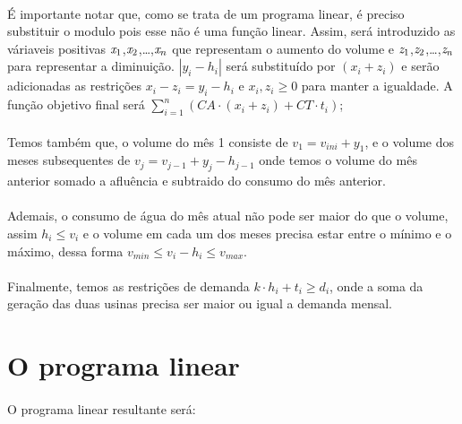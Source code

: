 \documentclass{article}
\begin{document}
\paragraph{} É importante notar que, como se trata de um programa linear, é preciso substituir o modulo pois esse não é uma função linear. Assim, será introduzido as váriaveis positivas $\emph{x}_1$,$\emph{x}_2$,\dots,$\emph{x}_n$ que representam o aumento do volume e $\emph{z}_1$,$\emph{z}_2$,\dots,$\emph{z}_n$ para representar a diminuição. \emph{$| y_{i} - h_{i} |$} será substituído por \emph{$(x_i + z_i)$} e serão adicionadas as restrições \emph{$x_i - z_i = y_i - h_i$} e \emph{$x_i,z_i \ge 0$} para manter a igualdade. A função objetivo final será \emph{$\sum_{i=1}^{n} (CA \cdot (x_i + z_i) + CT \cdot t_{i})$};
\paragraph{} Temos também que, o volume do mês 1 consiste de \emph{$v_1 = v_{ini} + y_1$}, e o volume dos meses subsequentes de \emph{$v_j = v_{j-1} + y_j - h_{j-1}$} onde temos o volume do mês anterior somado a afluência e subtraido do consumo do mês anterior. 
\paragraph{} Ademais, o consumo de água do mês atual não pode ser maior do que o volume, assim \emph{$h_i \le v_i$} e o volume em cada um dos meses precisa estar entre o mínimo e o máximo, dessa forma \emph{$v_{min} \le v_i - h_i \le v_{max}$}.
\paragraph{} Finalmente, temos as restrições de demanda \emph{$k \cdot h_i + t_i \ge d_i $}, onde a soma da geração das duas usinas precisa ser maior ou igual a demanda mensal.

\section{O programa linear}
\paragraph{} O programa linear resultante será:
\end{document}
